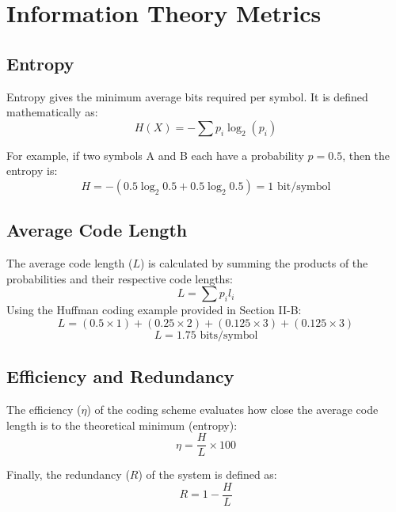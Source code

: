 \documentclass[10pt, conference]{IEEEtran}
\begin{document}
\section{\large \textbf{Information Theory Metrics}}

\subsection{\textbf{Entropy}}
Entropy gives the minimum average bits required per symbol. It is defined mathematically as:
\begin{equation}
H(X) = - \sum p_i \log_2 (p_i)
\end{equation}

For example, if two symbols A and B each have a probability $p = 0.5$, then the entropy is:
\begin{equation}
H = - (0.5 \log_2 0.5 + 0.5 \log_2 0.5) = 1 \text{ bit/symbol}
\end{equation}

\subsection{\textbf{Average Code Length}}
The average code length ($L$) is calculated by summing the products of the probabilities and their respective code lengths:
\begin{equation}
L = \sum p_i l_i
\end{equation}
Using the Huffman coding example provided in Section II-B:
\begin{equation}
L = (0.5 \times 1) + (0.25 \times 2) + (0.125 \times 3) + (0.125 \times 3)
\end{equation}
\begin{equation}
L = 1.75 \text{ bits/symbol}
\end{equation}

\subsection{\textbf{Efficiency and Redundancy}}
The efficiency ($\eta$) of the coding scheme evaluates how close the average code length is to the theoretical minimum (entropy):
\begin{equation}
\eta = \frac{H}{L} \times 100
\end{equation}

Finally, the redundancy ($R$) of the system is defined as:
\begin{equation}
R = 1 - \frac{H}{L}
\end{equation}
\end{document}
